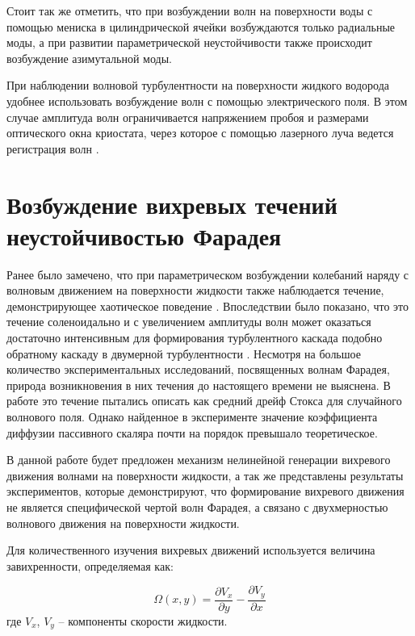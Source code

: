 Стоит так же отметить, что при возбуждении волн на поверхности воды с помощью мениска в цилиндрической ячейки возбуждаются только радиальные моды, а при развитии параметрической неустойчивости также происходит возбуждение азимутальной моды.



При наблюдении волновой турбулентности на поверхности жидкого водорода удобнее использовать возбуждение волн с помощью электрического поля. В этом случае амплитуда волн ограничивается напряжением пробоя и размерами оптического окна криостата, через которое с помощью лазерного луча ведется регистрация волн \cite{Brazhnikov2002}.



\section{Возбуждение вихревых течений неустойчивостью Фарадея}%

Ранее было замечено, что при параметрическом возбуждении колебаний наряду с волновым движением на поверхности жидкости также наблюдается течение, демонстрирующее хаотическое поведение \cite{Ramshankar1990}. Впоследствии было показано, что это течение соленоидально и с увеличением амплитуды волн может оказаться достаточно интенсивным для формирования турбулентного каскада \cite{VonKameke2011, Francois2014} подобно обратному каскаду в двумерной турбулентности \cite{Kraichnan1967}. Несмотря на большое количество экспериментальных исследований, посвященных волнам Фарадея, природа возникновения в них течения до настоящего времени не выяснена. В работе \cite{Mesquita1992} это течение пытались описать как средний дрейф Стокса \cite{Stokes1847} для случайного волнового поля. Однако найденное в эксперименте значение коэффициента диффузии пассивного скаляра почти на порядок превышало теоретическое.

В данной работе будет предложен механизм нелинейной генерации вихревого движения волнами на поверхности жидкости, а так же представлены результаты экспериментов, которые демонстрируют, что формирование вихревого движения не является специфической чертой волн Фарадея, а связано с двухмерностью волнового движения на поверхности жидкости.

Для количественного изучения вихревых движений используется величина завихренности, определяемая как:

\begin{equation}
 \label{eq:defVort}
\Omega(x, y) = \frac{\partial V_x}{\partial y} - \frac{\partial V_y}{\partial x}
\end{equation}
где $V_x$, $V_y$ – компоненты скорости жидкости. 

